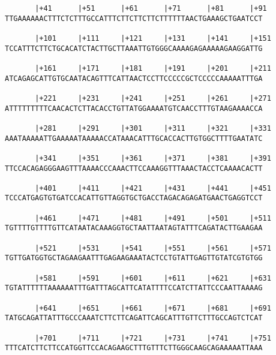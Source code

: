 \documentclass{article}
\begin{document}
\begin{Verbatim}
       |+41      |+51      |+61      |+71      |+81      |+91
TTGAAAAAACTTTCTCTTTGCCATTTCTTCTTCTTCTTTTTTAACTGAAAGCTGAATCCT
                                                            
       |+101     |+111     |+121     |+131     |+141     |+151
TCCATTTCTTCTGCACATCTACTTGCTTAAATTGTGGGCAAAAGAGAAAAAGAAGGATTG
                                                            
       |+161     |+171     |+181     |+191     |+201     |+211
ATCAGAGCATTGTGCAATACAGTTTCATTAACTCCTTCCCCCGCTCCCCCAAAAATTTGA
                                                            
       |+221     |+231     |+241     |+251     |+261     |+271
ATTTTTTTTTCAACACTCTTACACCTGTTATGGAAAATGTCAACCTTTGTAAGAAAACCA
                                                            
       |+281     |+291     |+301     |+311     |+321     |+331
AAATAAAAATTGAAAAATAAAAACCATAAACATTTGCACCACTTGTGGCTTTTGAATATC
                                                            
       |+341     |+351     |+361     |+371     |+381     |+391
TTCCACAGAGGGAAGTTTAAAACCCAAACTTCCAAAGGTTTAAACTACCTCAAAACACTT
                                                            
       |+401     |+411     |+421     |+431     |+441     |+451
TCCCATGAGTGTGATCCACATTGTTAGGTGCTGACCTAGACAGAGATGAACTGAGGTCCT
                                                            
       |+461     |+471     |+481     |+491     |+501     |+511
TGTTTTGTTTTGTTCATAATACAAAGGTGCTAATTAATAGTATTTCAGATACTTGAAGAA
                                                            
       |+521     |+531     |+541     |+551     |+561     |+571
TGTTGATGGTGCTAGAAGAATTTGAGAAGAAATACTCCTGTATTGAGTTGTATCGTGTGG
                                                            
       |+581     |+591     |+601     |+611     |+621     |+631
TGTATTTTTTAAAAAATTTGATTTAGCATTCATATTTTCCATCTTATTCCCAATTAAAAG
                                                            
       |+641     |+651     |+661     |+671     |+681     |+691
TATGCAGATTATTTGCCCAAATCTTCTTCAGATTCAGCATTTGTTCTTTGCCAGTCTCAT
                                                            
       |+701     |+711     |+721     |+731     |+741     |+751
TTTCATCTTCTTCCATGGTTCCACAGAAGCTTTGTTTCTTGGGCAAGCAGAAAAATTAAA
                                                            

\end{Verbatim}
\end{document}
